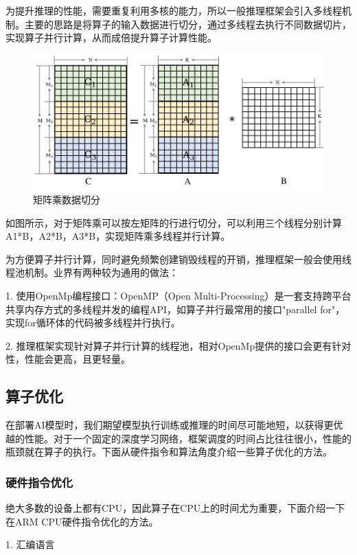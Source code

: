 为提升推理的性能，需要重复利用多核的能力，所以一般推理框架会引入多线程机制。主要的思路是将算子的输入数据进行切分，通过多线程去执行不同数据切片，实现算子并行计算，从而成倍提升算子计算性能。
 
 \begin{figure}[h]
\centering
\includegraphics[scale=0.8]{figs/ch09/ch09-parallel.png}
\caption{矩阵乘数据切分}
\label{figs:ch09_parallel}
\end{figure}

如图所示，对于矩阵乘可以按左矩阵的行进行切分，可以利用三个线程分别计算A1*B，A2*B，A3*B，实现矩阵乘多线程并行计算。

为方便算子并行计算，同时避免频繁创建销毁线程的开销，推理框架一般会使用线程池机制。业界有两种较为通用的做法：

1. 使用OpenMp编程接口：OpenMP（Open Multi-Processing）是一套支持跨平台共享内存方式的多线程并发的编程API，如算子并行最常用的接口"parallel for"，实现for循环体的代码被多线程并行执行。

2. 推理框架实现针对算子并行计算的线程池，相对OpenMp提供的接口会更有针对性，性能会更高，且更轻量。

\subsection{算子优化}\label{sec:ch09/ch09-kernel-optimization}
在部署AI模型时，我们期望模型执行训练或推理的时间尽可能地短，以获得更优越的性能。对于一个固定的深度学习网络，框架调度的时间占比往往很小，性能的瓶颈就在算子的执行。下面从硬件指令和算法角度介绍一些算子优化的方法。

\subsubsection{硬件指令优化}
绝大多数的设备上都有CPU，因此算子在CPU上的时间尤为重要，下面介绍一下在ARM CPU硬件指令优化的方法。

1. 汇编语言

